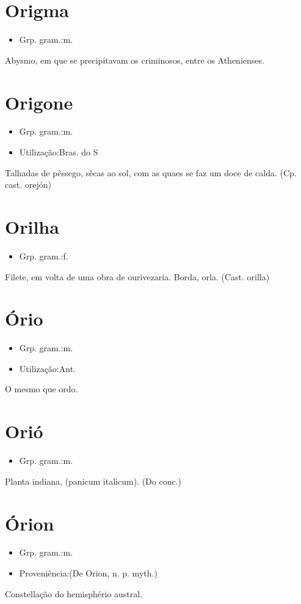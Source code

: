 \section{Origma}
\begin{itemize}
\item {Grp. gram.:m.}
\end{itemize}
Abysmo, em que se precipitavam os criminosos, entre os Athenienses.
\section{Origone}
\begin{itemize}
\item {Grp. gram.:m.}
\end{itemize}
\begin{itemize}
\item {Utilização:Bras. do S}
\end{itemize}
Talhadas de pêssego, sêcas ao sol, com as quaes se faz um doce de calda.
(Cp. cast. \textunderscore orejón\textunderscore )
\section{Orilha}
\begin{itemize}
\item {Grp. gram.:f.}
\end{itemize}
Filete, em volta de uma obra de ourivezaria.
Borda, orla.
(Cast. \textunderscore orilla\textunderscore )
\section{Ório}
\begin{itemize}
\item {Grp. gram.:m.}
\end{itemize}
\begin{itemize}
\item {Utilização:Ant.}
\end{itemize}
O mesmo que \textunderscore ordo\textunderscore .
\section{Orió}
\begin{itemize}
\item {Grp. gram.:m.}
\end{itemize}
Planta indiana, (\textunderscore panicum italicum\textunderscore ).
(Do conc.)
\section{Órion}
\begin{itemize}
\item {Grp. gram.:m.}
\end{itemize}
\begin{itemize}
\item {Proveniência:(De \textunderscore Orion\textunderscore , n. p. myth.)}
\end{itemize}
Constellação do hemisphério austral.
